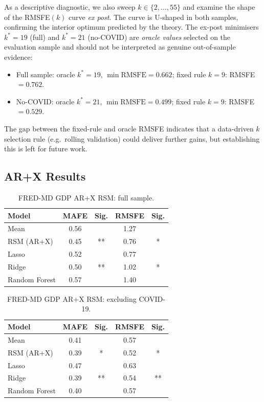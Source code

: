 \documentclass[12pt,a4paper]{article}
\theoremstyle{definition}
\begin{document}
As a descriptive diagnostic, we also sweep $k\in\{2,\ldots,55\}$ and
examine the shape of the RMSFE$(k)$ curve \emph{ex post}. The curve is
U-shaped in both samples, confirming the interior optimum predicted by the
theory. The ex-post minimisers $k^*=19$ (full) and $k^*=21$ (no-COVID)
are \emph{oracle values} selected on the evaluation sample and should not
be interpreted as genuine out-of-sample evidence:
\begin{itemize}[nosep]
\item Full sample: oracle $k^*=19$, $\min\mathrm{RMSFE}=0.662$;
  fixed rule $k=9$: RMSFE $=0.762$.
\item No-COVID: oracle $k^*=21$, $\min\mathrm{RMSFE}=0.499$;
  fixed rule $k=9$: RMSFE $=0.529$.
\end{itemize}
The gap between the fixed-rule and oracle RMSFE indicates that a
data-driven $k$ selection rule (e.g.\ rolling validation) could
deliver further gains, but establishing this is left for future work.

\subsection{AR+X Results}

\begin{table}[ht]
\centering
\caption{FRED-MD GDP AR+X RSM: full sample.}
\label{tab:gdp_arx_full}
\begin{tabular}{lcccc}
\toprule
Model & MAFE & Sig. & RMSFE & Sig. \\
\midrule
Mean          & 0.56 &    & 1.27 &   \\
RSM (AR+X)    & 0.45 & ** & 0.76 & * \\
Lasso         & 0.52 &    & 0.77 &   \\
Ridge         & 0.50 & ** & 1.02 & * \\
Random Forest & 0.57 &    & 1.40 &   \\
\bottomrule
\end{tabular}
\end{table}

\begin{table}[ht]
\centering
\caption{FRED-MD GDP AR+X RSM: excluding COVID-19.}
\label{tab:gdp_arx_nocov}
\begin{tabular}{lcccc}
\toprule
Model & MAFE & Sig. & RMSFE & Sig. \\
\midrule
Mean          & 0.41 &    & 0.57 &    \\
RSM (AR+X)    & 0.39 & *  & 0.52 & *  \\
Lasso         & 0.47 &    & 0.63 &    \\
Ridge         & 0.39 & ** & 0.54 & ** \\
Random Forest & 0.40 &    & 0.57 &    \\
\bottomrule
\end{tabular}
\end{table}
\end{document}
